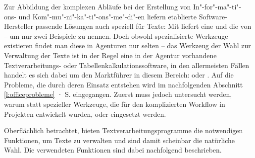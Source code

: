 Zur Abbildung der komplexen Abläufe bei der Erstellung von In"-for"-ma"-ti"-ons- und Kom"-mu"-ni"-ka"-ti"-ons"-me"-di"-en liefern etablierte Software-Hersteller passende Lösungen auch speziell für Texte: Mit  liefert  eine  \cite{adobeincopy} und  die  von   \cite{woodwing} -- um nur zwei Beispiele zu nennen. Doch obwohl spezialisierte Werkzeuge existieren findet man diese in Agenturen nur selten -- das Werkzeug der Wahl zur Verwaltung der Texte ist in der Regel eine in der Agentur vorhandene Textverarbeitungs- oder Tabellenkalkulationssoftware, in den allermeisten Fällen handelt es sich dabei um den Marktführer in diesem Bereich:   oder . Auf die Probleme, die durch deren Einsatz entstehen wird im nachfolgenden Abschnitt \ref{l:officeprobleme} · S.\pageref{l:officeprobleme} eingegangen. Zuerst muss jedoch untersucht werden, warum statt spezieller Werkzeuge, die für den komplizierten Workflow in Projekten entwickelt wurden,  oder  eingesetzt werden.

\bigskip

Oberflächlich betrachtet, bieten Textverarbeitungsprogramme die notwendigen Funktionen, um Texte zu verwalten und sind damit scheinbar die natürliche Wahl. Die verwendeten Funktionen sind dabei nachfolgend beschrieben.

